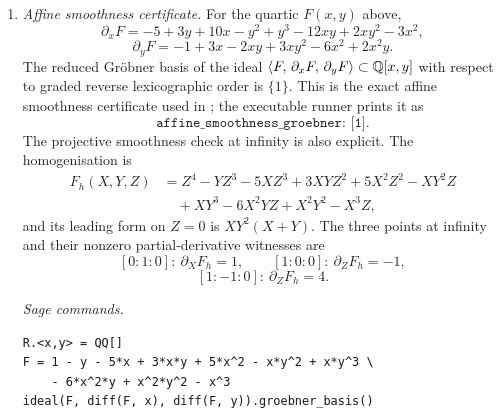 \begin{enumerate}[label=(\alph*)]
  \item \textit{Affine smoothness certificate.}\quad
    For the quartic \(F(x,y)\) above,
    \[
      \partial_xF
      =-5+3y+10x-y^2+y^3-12xy+2xy^2-3x^2,
    \]
    \[
      \partial_yF
      =-1+3x-2xy+3xy^2-6x^2+2x^2y.
    \]
    The reduced Gr\"obner basis of the ideal
    \(\langle F,\,\partial_xF,\,\partial_yF\rangle\subset\mathbb{Q}[x,y]\)
    with respect to graded reverse lexicographic order is \(\{1\}\).
    This is the exact affine smoothness certificate used in
    ; the executable runner prints it
    as
    \[
      \texttt{affine\_smoothness\_groebner: [1]}.
    \]
    The projective smoothness check at infinity is also explicit.  The
    homogenisation is
    \[
    \begin{aligned}
      F_h(X,Y,Z)
      &=Z^4-YZ^3-5XZ^3+3XYZ^2+5X^2Z^2-XY^2Z\\
      &\quad+XY^3-6X^2YZ+X^2Y^2-X^3Z,
    \end{aligned}
    \]
    and its leading form on \(Z=0\) is \(XY^2(X+Y)\).  The three points
    at infinity and their nonzero partial-derivative witnesses are
    \[
      [0:1:0]:\ \partial_XF_h=1,
      \qquad
      [1:0:0]:\ \partial_ZF_h=-1,
    \]
    \[
      [1:-1:0]:\ \partial_ZF_h=4.
    \]

    \medskip
    \noindent\textit{Sage commands.}
\begin{verbatim}
R.<x,y> = QQ[]
F = 1 - y - 5*x + 3*x*y + 5*x^2 - x*y^2 + x*y^3 \
    - 6*x^2*y + x^2*y^2 - x^3
ideal(F, diff(F, x), diff(F, y)).groebner_basis()
\end{verbatim}


\end{enumerate}
